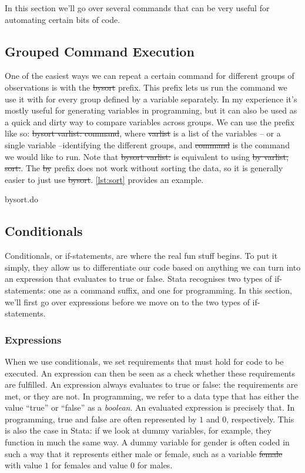 
In this section we'll go over several commands that can be very useful for automating certain bits of code.

\subsection{Grouped Command Execution}
One of the easiest ways we can repeat a certain command for different groups of observations is with the \st{bysort} prefix.
This prefix lets us run the command we use it with for every group defined by a variable separately.
In my experience it's mostly useful for generating variables in programming,
but it can also be used as a quick and dirty way to compare variables across groups.
We can use the prefix like so: \st{bysort varlist: command},
where \st{varlist} is a list of the variables -- or a single variable --identifying the different groups,
and \st{command} is the command we would like to run.
Note that \st{bysort varlist:} is equivalent to using \st{by varlist, sort:}.
The \st{by} prefix does not work without sorting the data, so it is generally easier to just use \st{bysort}.
\cref{lst:sort} provides an example.

\begin{listing}[tbp]
\caption{bysort.do}\label{lst:sort}
\end{listing}

\subsection{Conditionals}
Conditionals, or if-statements, are where the real fun stuff begins.
To put it simply,
they allow us to differentiate our code based on anything we can turn into an expression that evaluates to true or false.
Stata recognises two types of if-statements: one as a command suffix,
and one for programming.
In this section,
we'll first go over expressions before we move on to the two types of if-statements.

\subsubsection{Expressions}
When we use conditionals,
we set requirements that must hold for code to be executed.
An expression can then be seen as a check whether these requirements are fulfilled.
An expression always evaluates to true or false:
the requirements are met, or they are not.
In programming, we refer to a data type that has either the value ``true'' or ``false'' as a \emph{boolean}.
An evaluated expression is precisely that.
In programming,
true and false are often represented by $1$ and $0$, respectively.
This is also the case in Stata:
if we look at dummy variables,
for example,
they function in much the same way.
A dummy variable for gender is often coded in such a way that it represents either male or female,
such as a variable \st{female} with value $1$ for females and value $0$ for males.

